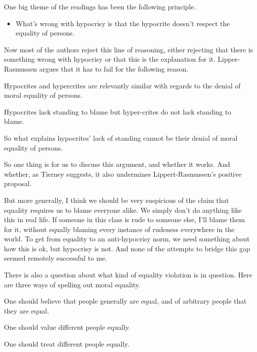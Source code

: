 \documentclass[
]{article}
\providecommand{\tightlist}{%
  \setlength{\itemsep}{0pt}\setlength{\parskip}{0pt}}
\begin{document}
One big theme of the readings has been the following principle.

\begin{itemize}
\tightlist
\item
  What's wrong with hypocrisy is that the hypocrite doesn't respect the
  equality of persons.
\end{itemize}

Now most of the authors reject this line of reasoning, either rejecting
that there is something wrong with hypocrisy or that this is the
explanation for it. Lipper-Rasmussen argues that it has to fail for the
following reason.

\begin{description}
\tightlist
\item[Relevantly Similar Equality Claim]
Hypocrites and hypercrites are relevantly similar with regards to the
denial of moral equality of persons.
\item[Standing Asymmetry Claim]
Hypocrites lack standing to blame but hyper-crites do not lack standing
to blame.
\item[Anti-Equality Conclusion]
So what explains hypocrites' lack of standing cannot be their denial of
moral equality of persons.
\end{description}

So one thing is for us to discuss this argument, and whether it works.
And whether, as Tierney suggests, it also undermines Lippert-Rasmussen's
positive proposal.

But more generally, I think we should be very suspicious of the claim
that equality requires us to blame everyone alike. We simply don't do
anything like this in real life. If someone in this class is rude to
someone else, I'll blame them for it, without equally blaming every
instance of rudeness everywhere in the world. To get from equality to an
anti-hypocrisy norm, we need something about how this is ok, but
hypocrisy is not. And none of the attempts to bridge this gap seemed
remotely successful to me.

There is also a question about what kind of equality violation is in
question. Here are three ways of spelling out moral equality.

\begin{description}
\tightlist
\item[Equality of Beliefs]
One should believe that people generally are equal, and of arbitrary
people that they are equal.
\item[Equality of Value]
One should value different people equally.
\item[Equality of Treatment]
One should treat different people equally.
\end{description}
\end{document}
